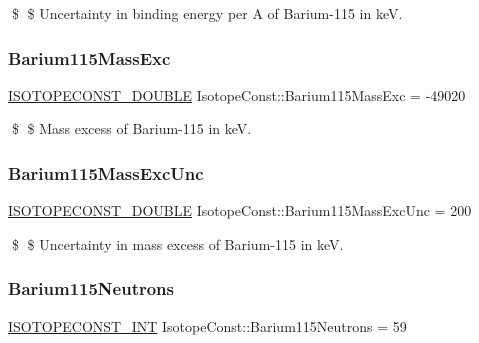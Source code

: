\$ \$ Uncertainty in binding energy per A of Barium-\/115 in keV. \mbox{\label{group___isotope_const-_barium-_ba115_gad23a85b48de2c33b8a78d6af9d317b28}} 
\subsubsection{\texorpdfstring{Barium115\+Mass\+Exc}{Barium115MassExc}}
{\footnotesize\ttfamily \mbox{\hyperlink{group___isotope_const-_macros_ga8f45a7272ce02c0b4c65c44636ed719a}{I\+S\+O\+T\+O\+P\+E\+C\+O\+N\+S\+T\+\_\+\+D\+O\+U\+B\+LE}} Isotope\+Const\+::\+Barium115\+Mass\+Exc = -\/49020}

\$ \$ Mass excess of Barium-\/115 in keV. \mbox{\label{group___isotope_const-_barium-_ba115_ga7b852a1106ec3f910e84ebc95cc28f88}} 
\subsubsection{\texorpdfstring{Barium115\+Mass\+Exc\+Unc}{Barium115MassExcUnc}}
{\footnotesize\ttfamily \mbox{\hyperlink{group___isotope_const-_macros_ga8f45a7272ce02c0b4c65c44636ed719a}{I\+S\+O\+T\+O\+P\+E\+C\+O\+N\+S\+T\+\_\+\+D\+O\+U\+B\+LE}} Isotope\+Const\+::\+Barium115\+Mass\+Exc\+Unc = 200}

\$ \$ Uncertainty in mass excess of Barium-\/115 in keV. \mbox{\label{group___isotope_const-_barium-_ba115_ga9661acb7080777b4071e690f20d06155}} 
\subsubsection{\texorpdfstring{Barium115\+Neutrons}{Barium115Neutrons}}
{\footnotesize\ttfamily \mbox{\hyperlink{group___isotope_const-_macros_ga5f18360b3e99483a35c32d789e62621c}{I\+S\+O\+T\+O\+P\+E\+C\+O\+N\+S\+T\+\_\+\+I\+NT}} Isotope\+Const\+::\+Barium115\+Neutrons = 59}

